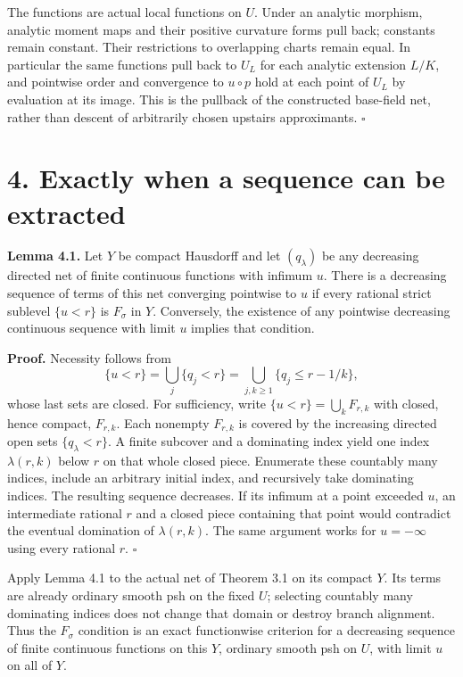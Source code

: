 \documentclass[
  11pt,
]{article}
\begin{document}
The functions are actual local functions on \(U\). Under an analytic
morphism, analytic moment maps and their positive curvature forms pull
back; constants remain constant. Their restrictions to overlapping
charts remain equal. In particular the same functions pull back to
\(U_L\) for each analytic extension \(L/K\), and pointwise order and
convergence to \(u\circ p\) hold at each point of \(U_L\) by evaluation
at its image. This is the pullback of the constructed base-field net,
rather than descent of arbitrarily chosen upstairs approximants.
\(\square\)

\section{4. Exactly when a sequence can be
extracted}\label{exactly-when-a-sequence-can-be-extracted}

\textbf{Lemma 4.1.} Let \(Y\) be compact Hausdorff and let
\((q_\lambda)\) be any decreasing directed net of finite continuous
functions with infimum \(u\). There is a decreasing sequence of terms of
this net converging pointwise to \(u\) if every rational strict sublevel
\(\{u<r\}\) is \(F_\sigma\) in \(Y\). Conversely, the existence of any
pointwise decreasing continuous sequence with limit \(u\) implies that
condition.

\textbf{Proof.} Necessity follows from \[
\{u<r\}=\bigcup_j\{q_j<r\}
=\bigcup_{j,k\geq1}\{q_j\leq r-1/k\},
\] whose last sets are closed. For sufficiency, write
\(\{u<r\}=\bigcup_k F_{r,k}\) with closed, hence compact, \(F_{r,k}\).
Each nonempty \(F_{r,k}\) is covered by the increasing directed open
sets \(\{q_\lambda<r\}\). A finite subcover and a dominating index yield
one index \(\lambda(r,k)\) below \(r\) on that whole closed piece.
Enumerate these countably many indices, include an arbitrary initial
index, and recursively take dominating indices. The resulting sequence
decreases. If its infimum at a point exceeded \(u\), an intermediate
rational \(r\) and a closed piece containing that point would contradict
the eventual domination of \(\lambda(r,k)\). The same argument works for
\(u=-\infty\) using every rational \(r\). \(\square\)

Apply Lemma 4.1 to the actual net of Theorem 3.1 on its compact \(Y\).
Its terms are already ordinary smooth psh on the fixed \(U\); selecting
countably many dominating indices does not change that domain or destroy
branch alignment. Thus the \(F_\sigma\) condition is an exact
functionwise criterion for a decreasing sequence of finite continuous
functions on this \(Y\), ordinary smooth psh on \(U\), with limit \(u\)
on all of \(Y\).
\end{document}
